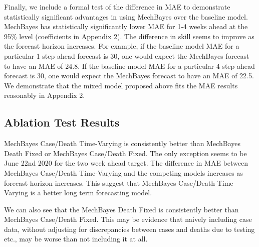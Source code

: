 \documentclass[11pt]{amsart}
\begin{document}
Finally, we include a formal test of the difference in MAE to demonstrate statistically significant advantages in using MechBayes over the baseline model. MechBayes has statistically significantly lower MAE for 1-4 weeks ahead at the 95\% level (coefficients in Appendix 2). The difference in skill seems to improve as the forecast horizon increases. For example, if the baseline model MAE for a particular 1 step ahead forecast is 30, one would expect the MechBayes forecast to have an MAE of 24.8.  If the baseline model MAE for a particular 4 step ahead forecast is 30, one would expect the MechBayes forecast to have an MAE of 22.5.  We demonstrate that the mixed model proposed above fits the MAE results reasonably in Appendix 2.


 \subsection{Ablation Test Results}

MechBayes Case/Death Time-Varying is consistently better than MechBayes Death Fixed or MechBayes Case/Death Fixed. The only exception seems to be June 22nd 2020 for the two week ahead target. The difference in MAE between MechBayes Case/Death Time-Varying and the competing models increases as forecast horizon increases. This suggest that MechBayes Case/Death Time-Varying is a better long term forecasting model.

We can also see that the MechBayes Death Fixed is consistently better than MechBayes Case/Death Fixed.  This may be evidence that naively including case data, without adjusting for discrepancies between cases and deaths due to testing etc., may be worse than not including it at all. 
\end{document}
